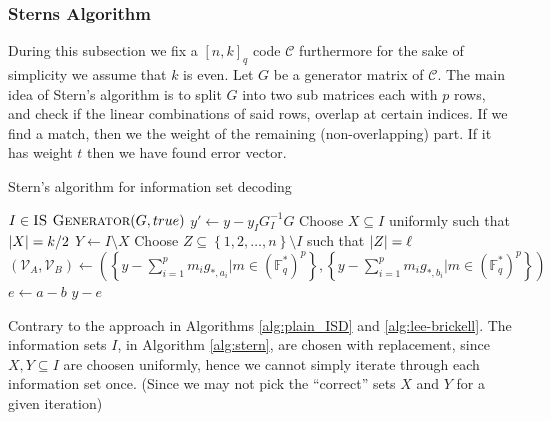 \subsubsection{Sterns Algorithm}
During this subsection we fix a $[n, k]_q$ code $\mathcal{C}$ furthermore for the sake of simplicity we assume that $k$ is even. Let $G$ be a generator matrix of $\mathcal{C}$. The main idea of Stern's algorithm is to split $G$ into two sub matrices each with $p$ rows, and check if the linear combinations of said rows, overlap at certain indices. If we find a match, then we the weight of the remaining (non-overlapping) part. If it has weight $t$ then we have found error vector.
\begin{algorithm}[H]
\caption{Stern's algorithm for information set decoding}\label{alg:stern}
\begin{algorithmic}
  \Loop
  \State $I \in \Call{IS Generator}{G, true}$ 
  \State $y' \gets y - y_I G_I^{-1}G$
  \State Choose $X \subseteq I$ uniformly such that $\left\lvert X\right\rvert = k / 2$
  \State $Y \gets I \setminus X$
  \State Choose $Z \subseteq \left\{1, 2, \ldots, n\right\} \setminus I$ such that $\left\lvert Z\right\rvert = \ell$
  \State $(\mathcal{V}_A, \mathcal{V}_{B}) \gets \left(\left\{y - \sum_{i = 1}^p m_i g_{*, a_i} | m \in (\mathbb{F}_q^{*})^p\right\}, \left\{y - \sum_{i = 1}^p m_i g_{*, b_i} | m \in (\mathbb{F}_q^{*})^p\right\}\right)$
    \State $e \gets a - b$
    \State \Return $y - e$
    \EndIf
    \EndFor
  \EndFor
  \EndLoop
  \EndProcedure
\end{algorithmic}
\end{algorithm}
\begin{remark}
  Contrary to the approach in Algorithms \ref{alg:plain_ISD} and \ref{alg:lee-brickell}. The information sets $I$, in Algorithm \ref{alg:stern}, are chosen with replacement, since $X, Y \subseteq I$ are choosen uniformly, hence we cannot simply iterate through each information set once. (Since we may not pick the ``correct'' sets $X$ and $Y$ for a given iteration)
\end{remark}

